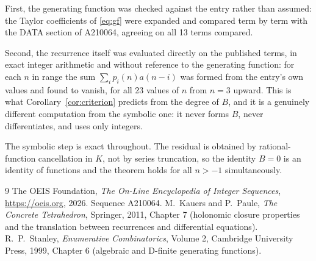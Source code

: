 \documentclass[11pt,a4paper]{article}
\theoremstyle{plain}
\theoremstyle{definition}
\begin{document}
First, the generating function was checked against the entry rather than assumed: the
Taylor coefficients of \eqref{eq:gf} were expanded and compared term by term with the DATA
section of A210064, agreeing on all 13 terms compared.

Second, the recurrence itself was evaluated directly on the published terms, in exact
integer arithmetic and without reference to the generating function: for each $n$ in range
the sum $\sum_{i}p_{i}(n)a(n-i)$ was formed from the entry's own values and found to
vanish, for all 23 values of $n$ from $n=3$ upward. This is what
Corollary~\ref{cor:criterion} predicts from the degree of $B$, and it is a genuinely
different computation from the symbolic one: it never forms $B$, never differentiates, and
uses only integers.

The symbolic step is exact throughout. The residual is obtained by rational-function
cancellation in $K$, not by series truncation, so the identity $B=0$ is an
identity of functions and the theorem holds for all $n>-1$ simultaneously.

\begin{thebibliography}{9}
 The OEIS Foundation, \emph{The On-Line Encyclopedia of Integer Sequences},
\url{https://oeis.org}, 2026. Sequence A210064.
 M.~Kauers and P.~Paule, \emph{The Concrete Tetrahedron}, Springer, 2011,
Chapter 7 (holonomic closure properties and the translation between recurrences and
differential equations).
 R.~P.~Stanley, \emph{Enumerative Combinatorics}, Volume 2, Cambridge
University Press, 1999, Chapter 6 (algebraic and D-finite generating functions).
\end{thebibliography}
\end{document}
